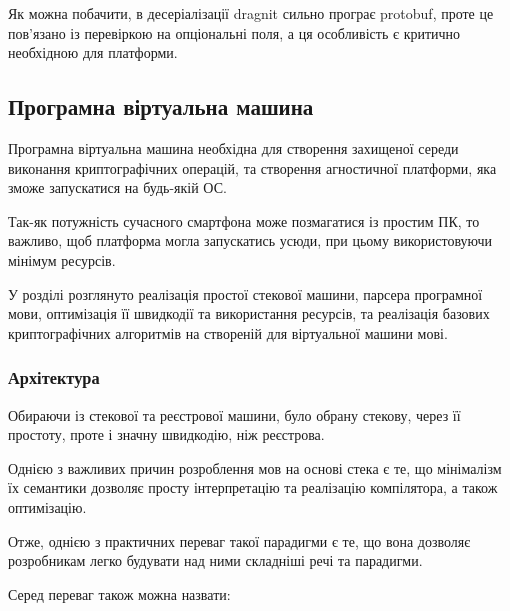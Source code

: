 \documentclass{lib/styles/default-style}
\begin{document}

    Як можна побачити, в десеріалізації dragnit сильно програє protobuf, проте це пов'язано із перевіркою на опціональні поля,
    а ця особливість є критично необхідною для платформи.
    
\subsection{Програмна віртуальна машина}

    Програмна віртуальна машина необхідна для створення захищеної середи виконання криптографічних операцій, та 
    створення агностичної платформи, яка зможе запускатися на будь-якій ОС.

    Так-як потужність сучасного смартфона може позмагатися із простим ПК, то важливо, щоб платформа могла запускатись усюди, 
    при цьому використовуючи мінімум ресурсів.

    У розділі розглянуто реалізація простої стекової машини, парсера програмної мови, оптимізація її швидкодії та використання ресурсів, 
    та реалізація базових криптографічних алгоритмів на створеній для віртуальної машини мові. 

    \subsubsection{Архітектура}

    Обираючи із стекової та реєстрової машини, було обрану стекову, через її простоту, проте і значну швидкодію, ніж реєстрова.

    Однією з важливих причин розроблення мов на основі стека є те,
    що мінімалізм їх семантики дозволяє просту інтерпретацію та реалізацію компілятора, а також оптимізацію.

    Отже, однією з практичних переваг такої парадигми є те,
    що вона дозволяє розробникам легко будувати над ними складніші речі та парадигми.

    Серед переваг також можна назвати:
\end{document}
